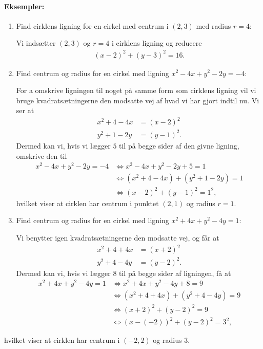 \paragraph*{Eksempler:}
\begin{enumerate}
\item Find cirklens ligning for en cirkel med centrum i $(2,3)$ med radius $r=4$:

Vi indsætter $(2,3)$ og $r=4$ i cirklens ligning og reducere
\begin{align*}
(x-2)^2+(y-3)^2=16.
\end{align*}
\item Find centrum og radius for en cirkel med ligning $x^2-4x+y^2-2y=-4$:

For a omskrive ligningen til noget på samme form som cirklens ligning vil vi bruge kvadratsætningerne den modsatte vej af hvad vi har gjort indtil nu. Vi ser at 
\begin{align*}
x^2+4-4x &= (x-2)^2 \\
y^2+1-2y &= (y-1)^2.
\end{align*} 
Dermed kan vi, hvis vi lægger $5$ til på begge sider af den givne ligning, omskrive den til
\begin{align*}
x^2-4x+y^2-2y=-4 &\Leftrightarrow x^2-4x+y^2-2y+5=1 \\
& \Leftrightarrow (x^2+4-4x)+(y^2+1-2y)=1 \\
& \Leftrightarrow (x-2)^2+(y-1)^2=1^2,
\end{align*}
hvilket viser at cirklen har centrum i punktet $(2,1)$ og radius $r=1$.
\item Find centrum og radius for en cirkel med ligning $x^2+4x+y^2-4y=1$:

Vi benytter igen kvadratsætningerne den modsatte vej, og får at
\begin{align*}
x^2+4+4x&=(x+2)^2\\
y^2+4-4y&=(y-2)^2.
\end{align*}
Dermed kan vi, hvis vi lægger $8$ til på begge sider af ligningen, få at
\begin{align*}
x^2+4x+y^2-4y = 1 &\Leftrightarrow x^2+4x+y^2-4y +8 = 9 \\
&\Leftrightarrow (x^2 + 4 + 4x) + (y^2 + 4 - 4y) = 9 \\
&\Leftrightarrow (x+2)^2 + (y-2)^2 = 9 \\
&\Leftrightarrow (x-(-2))^2+(y-2)^2 = 3^2,
\end{align*}
\end{enumerate}
hvilket viser at cirklen har centrum i $(-2,2)$ og radius $3$.